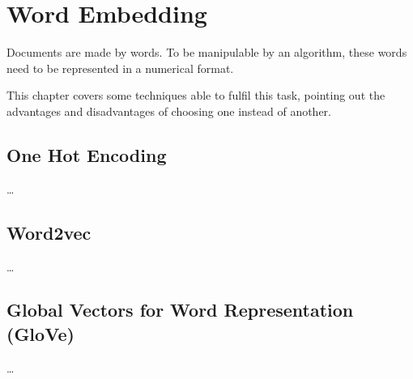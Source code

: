 \chapter{Word Embedding} \label{wordemb}
Documents are made by words.
To be manipulable by an algorithm, these words need to be represented in a numerical format.

This chapter covers some techniques able to fulfil this task,
pointing out the advantages and disadvantages of choosing one instead of another.

\section{One Hot Encoding}
\dots

\section{Word2vec}
\dots

\section{Global Vectors for Word Representation (GloVe)}
\dots